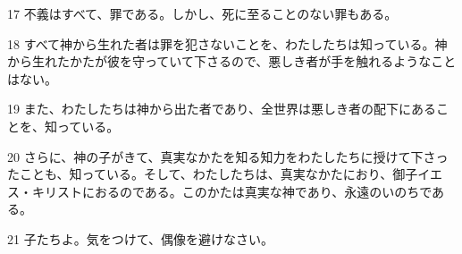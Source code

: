 \par 17 不義はすべて、罪である。しかし、死に至ることのない罪もある。
\par 18 すべて神から生れた者は罪を犯さないことを、わたしたちは知っている。神から生れたかたが彼を守っていて下さるので、悪しき者が手を触れるようなことはない。
\par 19 また、わたしたちは神から出た者であり、全世界は悪しき者の配下にあることを、知っている。
\par 20 さらに、神の子がきて、真実なかたを知る知力をわたしたちに授けて下さったことも、知っている。そして、わたしたちは、真実なかたにおり、御子イエス・キリストにおるのである。このかたは真実な神であり、永遠のいのちである。
\par 21 子たちよ。気をつけて、偶像を避けなさい。



